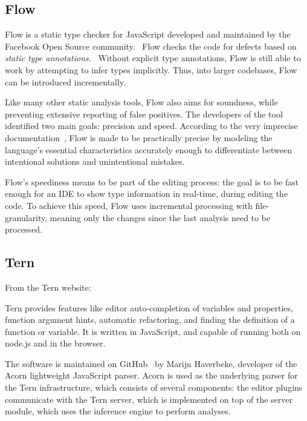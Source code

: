 \subsection{Flow}

Flow is a static type checker for JavaScript developed and maintained by the Facebook Open Source community.~\cite{flow-github} Flow checks the code for defects based on \emph{static type annotations}.~\cite{flow-website} Without explicit type annotations, Flow is still able to work by attempting to infer types implicitly. Thus, into larger codebases, Flow can be introduced incrementally.

Like many other static analysis tools, Flow also aims for soundness, while preventing extensive reporting of false positives. The developers of the tool identified two main goals: precision and speed. According to the very imprecise documentation~\cite{flow-docs}, Flow is made to be practically precise by modeling the language's essential characteristics accurately enough to differentiate between intentional solutions and unintentional mistakes.

Flow's speediness means to be part of the editing process: the goal is to be fast enough for an IDE to show type information in real-time, during editing the code. To achieve this speed, Flow uses incremental processing with file-granularity, meaning only the changes since the last analysis need to be processed.

\subsection{Tern}

From the Tern website: ~\cite{tern-website}

Tern provides features like editor auto-completion of variables and properties, function argument hints, automatic refactoring, and finding the definition of a function or variable. It is written in JavaScript, and capable of running both on node.js and in the browser.

The software is maintained on GitHub~\cite{tern-github} by Marijn Haverbeke, developer of the Acorn lightweight JavaScript parser. Acorn is used as the underlying parser for the Tern infrastructure, which consists of several components: the editor plugins communicate with the Tern server, which is implemented on top of the server module, which uses the inference engine to perform analyses.~\cite{tern-website}

